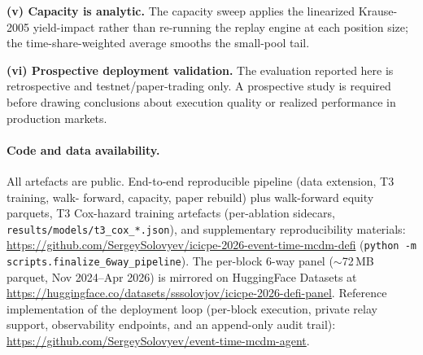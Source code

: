 \textbf{(v) Capacity is analytic.}  The capacity sweep applies the
linearized Krause-2005 yield-impact rather than re-running the
replay engine at each position size; the time-share-weighted
average smooths the small-pool tail.

\textbf{(vi) Prospective deployment validation.}  The evaluation
reported here is retrospective and testnet/paper-trading only.
A prospective study is required before drawing conclusions about
execution quality or realized performance in production markets.


\paragraph{Code and data availability.}  All artefacts are public.
End-to-end reproducible pipeline (data extension, T3 training, walk-
forward, capacity, paper rebuild) plus walk-forward equity parquets,
T3 Cox-hazard training artefacts (per-ablation sidecars,
\texttt{results/models/t3\_cox\_*.json}), and supplementary
reproducibility materials:
\url{https://github.com/SergeySolovyev/icicpe-2026-event-time-mcdm-defi}
(\texttt{python -m scripts.finalize\_6way\_pipeline}). The per-block
6-way panel ($\sim$72\,MB parquet, Nov 2024--Apr 2026) is mirrored
on HuggingFace Datasets at
\url{https://huggingface.co/datasets/sssolovjov/icicpe-2026-defi-panel}.
Reference implementation of the deployment loop (per-block
execution, private relay support, observability endpoints, and an
append-only audit trail):
\url{https://github.com/SergeySolovyev/event-time-mcdm-agent}.

